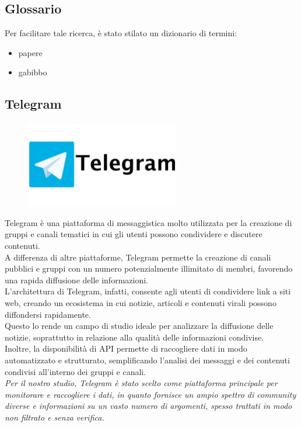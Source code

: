 \documentclass[12pt]{article}
\begin{document}
	\subsection{Glossario}
		Per facilitare tale ricerca, è stato stilato un dizionario di termini:
	\begin{itemize}[label=] 
		\item papere
		\item gabibbo
	\end{itemize}
	\subsection{Telegram}
	\begin{figure}[H]
		\centering
		\includegraphics[width=0.6\textwidth]{immagini/telegram}
	\end{figure}
	Telegram è una piattaforma di messaggistica molto utilizzata per la creazione di gruppi e canali tematici in cui gli utenti possono condividere e discutere contenuti.\\
	A differenza di altre piattaforme, Telegram permette la creazione di canali pubblici e gruppi con un numero potenzialmente illimitato di membri, favorendo una rapida diffusione delle informazioni. \\L'architettura di Telegram, infatti, consente agli utenti di condividere link a siti web, creando un ecosistema in cui notizie, articoli e contenuti virali possono diffondersi rapidamente. \\Questo lo rende un campo di studio ideale per analizzare la diffusione delle notizie, soprattutto in relazione alla qualità delle informazioni condivise. \\Inoltre, la disponibilità di API permette di raccogliere dati in modo automatizzato e strutturato, semplificando l'analisi dei messaggi e dei contenuti condivisi all'interno dei gruppi e canali. \\\textit{Per il nostro studio, Telegram è stato scelto come piattaforma principale per monitorare e raccogliere i dati, in quanto fornisce un ampio spettro di community diverse e informazioni su un vasto numero di argomenti, spesso trattati in modo non filtrato e senza verifica.}
\end{document}
